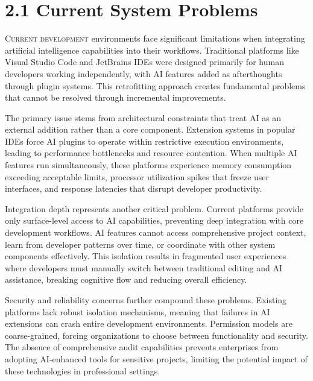 
\section{2.1 Current System Problems}
\label{sec:current-system-problems}

\lettrine{C}{urrent development} environments face significant limitations when integrating artificial intelligence capabilities into their workflows. Traditional platforms like Visual Studio Code and JetBrains IDEs were designed primarily for human developers working independently, with AI features added as afterthoughts through plugin systems. This retrofitting approach creates fundamental problems that cannot be resolved through incremental improvements.

The primary issue stems from architectural constraints that treat AI as an external addition rather than a core component. Extension systems in popular IDEs force AI plugins to operate within restrictive execution environments, leading to performance bottlenecks and resource contention. When multiple AI features run simultaneously, these platforms experience memory consumption exceeding acceptable limits, processor utilization spikes that freeze user interfaces, and response latencies that disrupt developer productivity.

Integration depth represents another critical problem. Current platforms provide only surface-level access to AI capabilities, preventing deep integration with core development workflows. AI features cannot access comprehensive project context, learn from developer patterns over time, or coordinate with other system components effectively. This isolation results in fragmented user experiences where developers must manually switch between traditional editing and AI assistance, breaking cognitive flow and reducing overall efficiency.

Security and reliability concerns further compound these problems. Existing platforms lack robust isolation mechanisms, meaning that failures in AI extensions can crash entire development environments. Permission models are coarse-grained, forcing organizations to choose between functionality and security. The absence of comprehensive audit capabilities prevents enterprises from adopting AI-enhanced tools for sensitive projects, limiting the potential impact of these technologies in professional settings.
